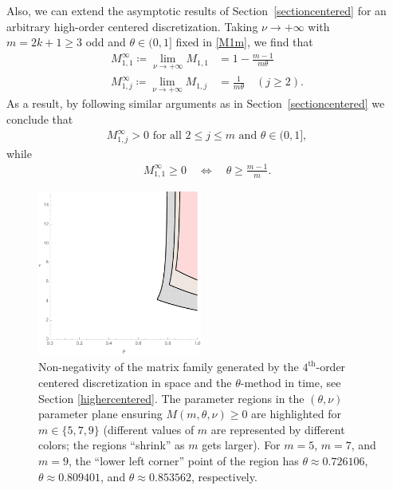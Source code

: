 \documentclass[a4paper]{article}
\newcommand{\te}{\theta}
\begin{document}
\begin{description}[style=unboxed,leftmargin=0cm]
Also, we can extend the asymptotic results of Section~\ref{sectioncentered} for an arbitrary high-order centered
discretization.
Taking $\nu \to +\infty$ with $m=2k+1\ge 3$ odd and $\te \in (0,1]$ fixed in \eqref{M1m}, we find that
\begin{align*}
    M_{1,1}^\infty \coloneqq \lim_{\nu \to +\infty} M_{1,1} & =  1-\frac{m-1}{m\theta} \\
    M_{1,j}^\infty \coloneqq \lim_{\nu \to +\infty} M_{1,j} & = \frac{1}{m\theta} \quad (j \ge 2).
\end{align*}
As a result, by following similar arguments as in Section~\ref{sectioncentered} we conclude that
\begin{align*}
	M_{1,j}^\infty > 0 \text{ for all } 2\le j\le m \text{ and } \te \in (0,1],
\end{align*}
while
\begin{align*}
	M_{1,1}^\infty \ge 0 \quad\Longleftrightarrow \quad \theta \ge \frac{m-1}{m}.
\end{align*}
\end{description}

\begin{figure}
\begin{center}
\includegraphics[width=0.48\textwidth]{fig_5stencilm579.pdf}
\caption{Non-negativity of the matrix family generated by the $4^\text{th}$-order centered discretization in space and the $\theta$-method in time, see Section \ref{highercentered}. The parameter regions in the $(\te,\nu)$ parameter plane ensuring $M(m,\te,\nu)\ge 0$ are highlighted for $m\in\{5, 7, 9\}$ (different values of $m$ are represented by different colors; the regions ``shrink'' as $m$ gets larger). For $m=5$, $m=7$, and $m=9$, the ``lower left corner'' point of the region has $\theta\approx 0.726106$, $\theta\approx 0.809401$, and $\theta\approx 0.853562$, respectively.}\label{fig_5stencilm579}
\end{center}
\end{figure}
\end{document}

